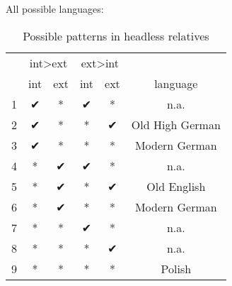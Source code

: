 All possible languages:

\begin{table}[H]
  \center
  \caption{Possible patterns in headless relatives}
    \begin{tabular}{ccc|ccc}
    \toprule
      &   \multicolumn{2}{c}{\ac{int}>\ac{ext}}   & \multicolumn{2}{|c}{\ac{ext}>\ac{int}}  &                  \\
          \cmidrule(lr){2-3}                      \cmidrule(lr){4-5}
      &   \ac{int}            & \ac{ext}          & \ac{int}          & \ac{ext}            & language         \\
          \cmidrule(lr){2-2}  \cmidrule(lr){3-3}  \cmidrule(lr){4-4}  \cmidrule(lr){5-5}    \cmidrule(lr){6-6}
    1 &   ✔                   & *                 & ✔               & *                     & n.a.             \\
    2 &   ✔                   & *                 & *               & ✔                     & Old High German  \\
    3 &   ✔                   & *                 & *               & *                     & Modern German    \\
    4 &   {*}                 & ✔                 & ✔               & *                     & n.a.             \\
    5 &   {*}                 & ✔                 & *               & ✔                     & Old English      \\
    6 &   {*}                 & ✔                 & *               & *                     & Modern German    \\
    7 &   {*}                 & *                 & ✔               & *                     & n.a.             \\
    8 &   {*}                 & *                 & *               & ✔                     & n.a.             \\
    9 &   {*}                 & *                 & *               & *                     & Polish           \\
    \bottomrule
  \end{tabular}
    \label{tbl:possible-headless-relatives}
\end{table}

